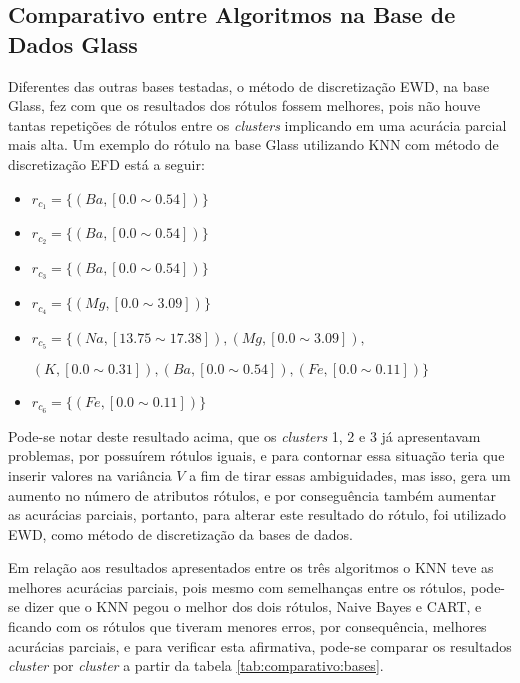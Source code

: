 \subsection{Comparativo entre Algoritmos na Base de Dados Glass} \label{cap:resultados:ssec:compalgoritmos:glass}

Diferentes das outras bases testadas, o método de discretização EWD, na base Glass, fez com que os resultados dos rótulos fossem melhores, pois não houve tantas repetições de rótulos entre os \textit{clusters} implicando em uma acurácia parcial mais alta. Um exemplo do rótulo na base Glass utilizando KNN com método de discretização EFD está a seguir:
\begin{itemize}[noitemsep]
 \item ${r_{c_1}=\{ (Ba,[ 0.0 \sim 0.54 ] )\} }$
 \item ${r_{c_2}=\{(Ba,[ 0.0 \sim 0.54 ] ) \} }$
 \item ${r_{c_3}=\{ (Ba,[ 0.0 \sim 0.54 ])  \} }$  
 \item ${r_{c_4}=\{ (Mg,[ 0.0 \sim 3.09 ] ) \}}$
 \item ${r_{c_5}=\{ (Na,[13.75 \sim  17.38 ] ), (Mg,[ 0.0 \sim 3.09 ] ), }$
 
 ${(K,[ 0.0 \sim 0.31 ] ), (Ba,[ 0.0 \sim 0.54 ] ), (Fe,[ 0.0 \sim 0.11] ) \} }$
 \item ${r_{c_6}=\{ (Fe,[ 0.0 \sim 0.11] ) \} }$
\end{itemize}

Pode-se notar deste resultado acima, que os \textit{clusters} 1, 2 e 3 já apresentavam problemas, por possuírem rótulos iguais, e para contornar essa situação teria que inserir valores na variância ${V}$ a fim de tirar essas ambiguidades, mas isso, gera um aumento no número de atributos rótulos, e por conseguência também aumentar as  acurácias parciais, portanto, para alterar este resultado do rótulo, foi utilizado EWD, como método de discretização da bases de dados.
 
Em relação aos resultados apresentados entre os três algoritmos o KNN teve as melhores acurácias parciais, pois mesmo com semelhanças entre os rótulos, pode-se dizer que o KNN pegou o melhor dos dois rótulos, Naive Bayes e CART, e ficando com os rótulos que tiveram menores erros, por consequência, melhores acurácias parciais, e para verificar esta afirmativa, pode-se comparar os resultados \textit{cluster} por \textit{cluster} a partir da tabela \ref{tab:comparativo:bases}.

